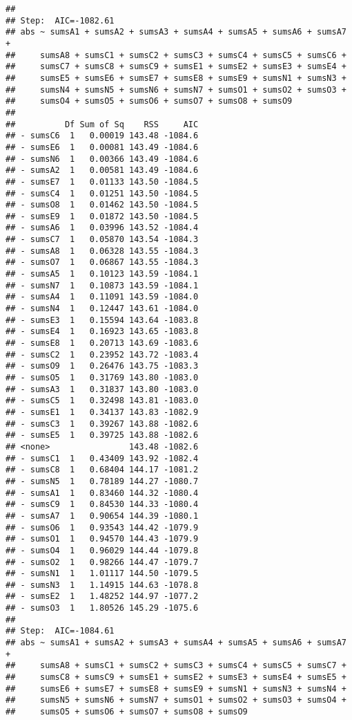\documentclass[,man,floatsintext]{apa6}
\begin{document}
\begin{verbatim}
## 
## Step:  AIC=-1082.61
## abs ~ sumsA1 + sumsA2 + sumsA3 + sumsA4 + sumsA5 + sumsA6 + sumsA7 + 
##     sumsA8 + sumsC1 + sumsC2 + sumsC3 + sumsC4 + sumsC5 + sumsC6 + 
##     sumsC7 + sumsC8 + sumsC9 + sumsE1 + sumsE2 + sumsE3 + sumsE4 + 
##     sumsE5 + sumsE6 + sumsE7 + sumsE8 + sumsE9 + sumsN1 + sumsN3 + 
##     sumsN4 + sumsN5 + sumsN6 + sumsN7 + sumsO1 + sumsO2 + sumsO3 + 
##     sumsO4 + sumsO5 + sumsO6 + sumsO7 + sumsO8 + sumsO9
## 
##          Df Sum of Sq    RSS     AIC
## - sumsC6  1   0.00019 143.48 -1084.6
## - sumsE6  1   0.00081 143.49 -1084.6
## - sumsN6  1   0.00366 143.49 -1084.6
## - sumsA2  1   0.00581 143.49 -1084.6
## - sumsE7  1   0.01133 143.50 -1084.5
## - sumsC4  1   0.01251 143.50 -1084.5
## - sumsO8  1   0.01462 143.50 -1084.5
## - sumsE9  1   0.01872 143.50 -1084.5
## - sumsA6  1   0.03996 143.52 -1084.4
## - sumsC7  1   0.05870 143.54 -1084.3
## - sumsA8  1   0.06328 143.55 -1084.3
## - sumsO7  1   0.06867 143.55 -1084.3
## - sumsA5  1   0.10123 143.59 -1084.1
## - sumsN7  1   0.10873 143.59 -1084.1
## - sumsA4  1   0.11091 143.59 -1084.0
## - sumsN4  1   0.12447 143.61 -1084.0
## - sumsE3  1   0.15594 143.64 -1083.8
## - sumsE4  1   0.16923 143.65 -1083.8
## - sumsE8  1   0.20713 143.69 -1083.6
## - sumsC2  1   0.23952 143.72 -1083.4
## - sumsO9  1   0.26476 143.75 -1083.3
## - sumsO5  1   0.31769 143.80 -1083.0
## - sumsA3  1   0.31837 143.80 -1083.0
## - sumsC5  1   0.32498 143.81 -1083.0
## - sumsE1  1   0.34137 143.83 -1082.9
## - sumsC3  1   0.39267 143.88 -1082.6
## - sumsE5  1   0.39725 143.88 -1082.6
## <none>                143.48 -1082.6
## - sumsC1  1   0.43409 143.92 -1082.4
## - sumsC8  1   0.68404 144.17 -1081.2
## - sumsN5  1   0.78189 144.27 -1080.7
## - sumsA1  1   0.83460 144.32 -1080.4
## - sumsC9  1   0.84530 144.33 -1080.4
## - sumsA7  1   0.90654 144.39 -1080.1
## - sumsO6  1   0.93543 144.42 -1079.9
## - sumsO1  1   0.94570 144.43 -1079.9
## - sumsO4  1   0.96029 144.44 -1079.8
## - sumsO2  1   0.98266 144.47 -1079.7
## - sumsN1  1   1.01117 144.50 -1079.5
## - sumsN3  1   1.14915 144.63 -1078.8
## - sumsE2  1   1.48252 144.97 -1077.2
## - sumsO3  1   1.80526 145.29 -1075.6
## 
## Step:  AIC=-1084.61
## abs ~ sumsA1 + sumsA2 + sumsA3 + sumsA4 + sumsA5 + sumsA6 + sumsA7 + 
##     sumsA8 + sumsC1 + sumsC2 + sumsC3 + sumsC4 + sumsC5 + sumsC7 + 
##     sumsC8 + sumsC9 + sumsE1 + sumsE2 + sumsE3 + sumsE4 + sumsE5 + 
##     sumsE6 + sumsE7 + sumsE8 + sumsE9 + sumsN1 + sumsN3 + sumsN4 + 
##     sumsN5 + sumsN6 + sumsN7 + sumsO1 + sumsO2 + sumsO3 + sumsO4 + 
##     sumsO5 + sumsO6 + sumsO7 + sumsO8 + sumsO9

\end{verbatim}
\end{document}
